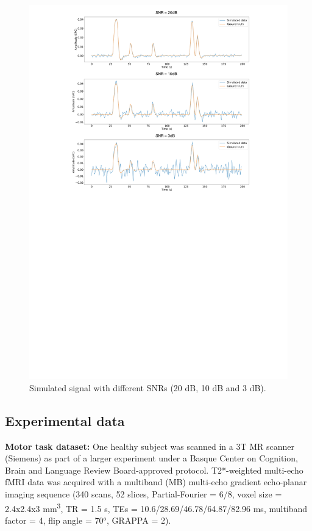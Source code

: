 \begin{figure}[h]
    \begin{center}
        \includegraphics[width=\columnwidth]{figures/sim.pdf}
    \end{center}
    \caption{Simulated signal with different SNRs (20 dB, 10 dB and 3 dB).}
\label{fig:simulations}
\end{figure}

\subsection{Experimental data}
\textbf{Motor task dataset:} One healthy subject was scanned in a 3T MR scanner (Siemens) as part of a larger experiment under a Basque Center on Cognition, Brain and Language Review Board-approved protocol. T2*-weighted multi-echo fMRI data was acquired with a multiband (MB) multi-echo gradient echo-planar imaging sequence (340 scans, 52 slices, Partial-Fourier = 6/8, voxel size = 2.4x2.4x3 mm\textsuperscript{3}, TR = 1.5 s, TEs = 10.6/28.69/46.78/64.87/82.96 ms, multiband factor = 4, flip angle = 70\(^o\), GRAPPA = 2).

